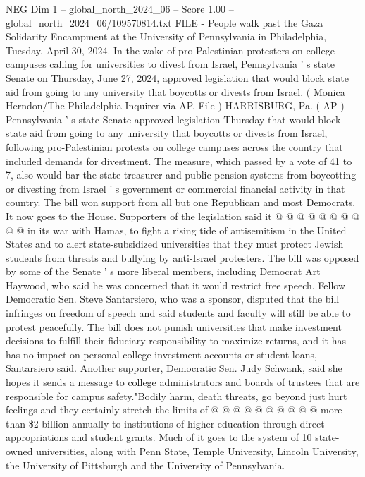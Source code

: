 \begin{textsample}{NEG Dim 1 – global\_north\_2024\_06 – Score 1.00 – global\_north\_2024\_06/109570814.txt}  \label{ex:f1_neg_218}
FILE - People walk past the Gaza Solidarity Encampment at the University of Pennsylvania in Philadelphia, Tuesday, April 30, 2024.
In the wake of pro-Palestinian protesters on college campuses calling for universities to divest from Israel, Pennsylvania ' s state Senate on Thursday, June 27, 2024, approved legislation that would block state aid from going to any university that boycotts or divests from Israel. ( Monica Herndon/The Philadelphia Inquirer via AP, File ) HARRISBURG, Pa. ( AP ) -- Pennsylvania ' s state Senate approved legislation Thursday that would block state aid from going to any university that boycotts or divests from Israel, following pro-Palestinian protests on college campuses across the country that included demands for divestment.
The measure, which passed by a vote of 41 to 7, also would bar the state treasurer and public pension systems from boycotting or divesting from Israel ' s government or commercial financial activity in that country.
The bill won support from all but one Republican and most Democrats.
It now goes to the House.
Supporters of the legislation said it @ @ @ @ @ @ @ @ @ @ in its war with Hamas, to fight a rising tide of antisemitism in the United States and to alert state-subsidized universities that they must protect Jewish students from threats and bullying by anti-Israel protesters.
The bill was opposed by some of the Senate ' s more liberal members, including Democrat Art Haywood, who said he was concerned that it would restrict free speech.
Fellow Democratic Sen.
Steve Santarsiero, who was a sponsor, disputed that the bill infringes on freedom of speech and said students and faculty will still be able to protest peacefully.
The bill does not punish universities that make investment decisions to fulfill their fiduciary responsibility to maximize returns, and it has has no impact on personal college investment accounts or student loans, Santarsiero said.
Another supporter, Democratic Sen.
Judy Schwank, said she hopes it sends a message to college administrators and boards of trustees that are responsible for campus safety."Bodily harm, death threats, go beyond just hurt feelings and they certainly stretch the limits of @ @ @ @ @ @ @ @ @ @ more than \$2 billion annually to institutions of higher education through direct appropriations and student grants.
Much of it goes to the system of 10 state-owned universities, along with Penn State, Temple University, Lincoln University, the University of Pittsburgh and the University of Pennsylvania.

\end{textsample}
